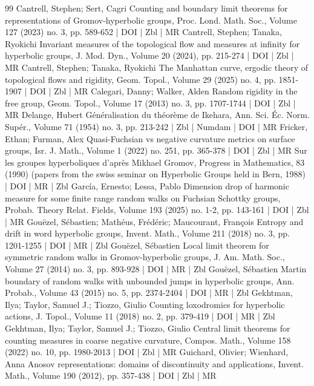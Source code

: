 \begin{thebibliography}{99}
 Cantrell, Stephen; Sert, Cagri Counting and boundary limit theorems for representations of Gromov-hyperbolic groups, Proc. Lond. Math. Soc., Volume 127 (2023) no. 3, pp. 589-652 | DOI | Zbl | MR
 Cantrell, Stephen; Tanaka, Ryokichi Invariant measures of the topological flow and measures at infinity for hyperbolic groups, J. Mod. Dyn., Volume 20 (2024), pp. 215-274 | DOI | Zbl | MR
 Cantrell, Stephen; Tanaka, Ryokichi The Manhattan curve, ergodic theory of topological flows and rigidity, Geom. Topol., Volume 29 (2025) no. 4, pp. 1851-1907 | DOI | Zbl | MR
 Calegari, Danny; Walker, Alden Random rigidity in the free group, Geom. Topol., Volume 17 (2013) no. 3, pp. 1707-1744 | DOI | Zbl | MR
 Delange, Hubert Généralisation du théorème de Ikehara, Ann. Sci. Éc. Norm. Supér., Volume 71 (1954) no. 3, pp. 213-242 | Zbl | Numdam | DOI | MR
 Fricker, Ethan; Furman, Alex Quasi-Fuchsian vs negative curvature metrics on surface groups, Isr. J. Math., Volume 1 (2022) no. 251, pp. 365-378 | DOI | Zbl | MR
 Sur les groupes hyperboliques d’après Mikhael Gromov, Progress in Mathematics, 83 (1990) (papers from the swiss seminar on Hyperbolic Groups held in Bern, 1988) | DOI | MR | Zbl
 García, Ernesto; Lessa, Pablo Dimension drop of harmonic measure for some finite range random walks on Fuchsian Schottky groups, Probab. Theory Relat. Fields, Volume 193 (2025) no. 1-2, pp. 143-161 | DOI | Zbl | MR
 Gouëzel, Sébastien; Mathéus, Frédéric; Maucourant, François Entropy and drift in word hyperbolic groups, Invent. Math., Volume 211 (2018) no. 3, pp. 1201-1255 | DOI | MR | Zbl
 Gouëzel, Sébastien Local limit theorem for symmetric random walks in Gromov-hyperbolic groups, J. Am. Math. Soc., Volume 27 (2014) no. 3, pp. 893-928 | DOI | MR | Zbl
 Gouëzel, Sébastien Martin boundary of random walks with unbounded jumps in hyperbolic groups, Ann. Probab., Volume 43 (2015) no. 5, pp. 2374-2404 | DOI | MR | Zbl
 Gekhtman, Ilya; Taylor, Samuel J.; Tiozzo, Giulio Counting loxodromics for hyperbolic actions, J. Topol., Volume 11 (2018) no. 2, pp. 379-419 | DOI | MR | Zbl
 Gekhtman, Ilya; Taylor, Samuel J.; Tiozzo, Giulio Central limit theorems for counting measures in coarse negative curvature, Compos. Math., Volume 158 (2022) no. 10, pp. 1980-2013 | DOI | Zbl | MR
 Guichard, Olivier; Wienhard, Anna Anosov representations: domains of discontinuity and applications, Invent. Math., Volume 190 (2012), pp. 357-438 | DOI | Zbl | MR

\end{thebibliography}
